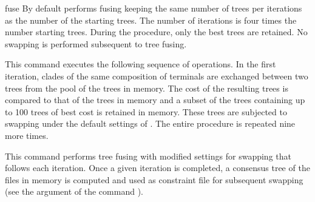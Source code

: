 \begin{command}{fuse}{}
        {By default \poy performs fusing keeping the same number of trees per
        iterations as the number of the starting trees. The number of iterations is
        four times the number starting trees. During the procedure, only the best
        trees are retained. No swapping is performed subsequent to tree fusing.}
        
    \begin{poyexamples}
	
            {This command executes the following sequence of operations. In the
            first iteration, clades of the same composition of terminals are exchanged
            between two trees from the pool of the trees in memory. The cost of the
            resulting trees is compared to that of the trees in memory and a subset of
            the trees containing up to 100 trees of best cost is retained in memory.
            These trees are subjected to swapping under the default settings of
            . The entire procedure is repeated nine more times.}
            
            {This command performs tree fusing  
            with modified settings for swapping that follows each iteration. Once
            a given iteration is completed, a consensus tree of the files in memory
            is computed and used as constraint file for subsequent swapping (see
            the argument  of the command
            ).}

     \end{poyexamples}
        
        \begin{poyalso}
    \end{poyalso}

\end{command}

